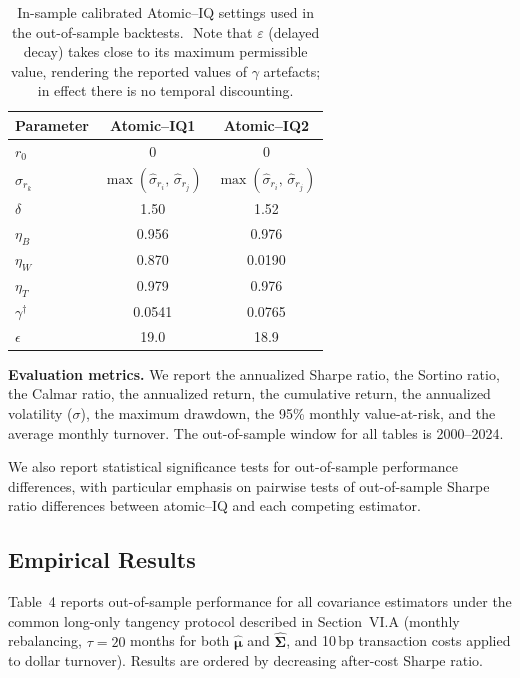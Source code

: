 \documentclass[12pt,letterpaper]{article}
\begin{document}
\begin{table}[t]
\centering
\begin{tabular}{lcc}
\hline
Parameter & Atomic--IQ1 & Atomic--IQ2 \\
\hline
$r_0$ & 0 & 0 \\
$\sigma_{r_k}$ & $\max\!\left(\hat{\sigma}_{r_i},\,\hat{\sigma}_{r_j}\right)$ & $\max\!\left(\hat{\sigma}_{r_i},\,\hat{\sigma}_{r_j}\right)$ \\
$\delta$ & 1.50 & 1.52 \\
$\eta_B$ & 0.956 & 0.976 \\
$\eta_W$ & 0.870 & 0.0190 \\
$\eta_T$ & 0.979 & 0.976 \\
$\gamma^\dagger$ & 0.0541 & 0.0765 \\
$\epsilon$ & 19.0 & 18.9 \\

\hline
\end{tabular}
\caption{In-sample calibrated Atomic--IQ settings used in the out-of-sample backtests.\,\textdagger\ Note that \(\varepsilon\) (delayed decay) takes close to its maximum permissible value, rendering the reported values of \(\gamma\) artefacts; in effect there is no temporal discounting.
}
\label{tab:aiq-final-params}
\end{table}

\vspace{0.35em}
\noindent\textbf{Evaluation metrics.}
We report the annualized Sharpe ratio, the Sortino ratio, the Calmar ratio, the annualized return, the cumulative return, the annualized volatility ($\sigma$), the maximum drawdown, the 95\% monthly value-at-risk, and the average monthly turnover. The out-of-sample window for all tables is 2000--2024.

We also report statistical significance tests for out-of-sample performance differences, with particular emphasis on pairwise tests of out-of-sample Sharpe ratio differences between atomic--IQ and each competing estimator.

\bigskip
\subsection{Empirical Results}
\label{sec:empirical}
Table~4 reports out-of-sample performance for all covariance estimators under the common long-only tangency protocol described in Section~VI.A (monthly rebalancing, $\tau=20$ months for both $\hat{\boldsymbol\mu}$ and $\hat{\boldsymbol\Sigma}$, and 10\,bp transaction costs applied to dollar turnover). Results are ordered by decreasing after-cost Sharpe ratio.
\end{document}

